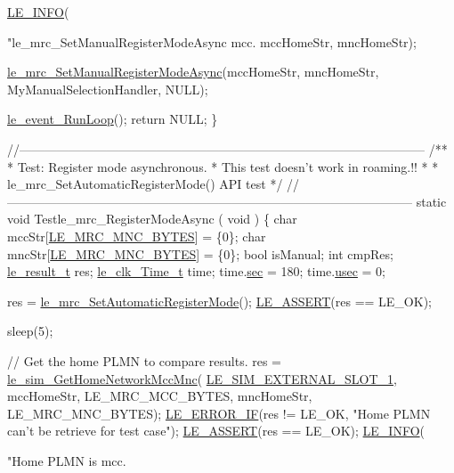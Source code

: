 \begin{DoxyCodeInclude}
{{{{{{    \hyperlink{le__log_8h_a23e6d206faa64f612045d688cdde5808}{LE\_INFO}(\textcolor{stringliteral}{"le\_mrc\_SetManualRegisterModeAsync mcc.%
        mccHomeStr, mncHomeStr);

    \hyperlink{le__mrc__interface_8h_a5b40356a56f524f5f5c9e5744687919d}{le\_mrc\_SetManualRegisterModeAsync}(mccHomeStr, mncHomeStr, 
      MyManualSelectionHandler, NULL);

    \hyperlink{le__event_loop_8h_ae313b457994371c658be9fe0494a01ff}{le\_event\_RunLoop}();
    \textcolor{keywordflow}{return} NULL;
\}


\textcolor{comment}{//--------------------------------------------------------------------------------------------------}\textcolor{comment}{}
\textcolor{comment}{/**}
\textcolor{comment}{ * Test: Register mode asynchronous.}
\textcolor{comment}{ * This test doesn't work in roaming.!!}
\textcolor{comment}{ *}
\textcolor{comment}{ * le\_mrc\_SetAutomaticRegisterMode() API test}
\textcolor{comment}{ */}
\textcolor{comment}{//--------------------------------------------------------------------------------------------------}
\textcolor{keyword}{static} \textcolor{keywordtype}{void} Testle\_mrc\_RegisterModeAsync
(
    \textcolor{keywordtype}{void}
)
\{
    \textcolor{keywordtype}{char} mccStr[\hyperlink{le__mrc__interface_8h_aeae0e240c77730be724ad7ac42596469}{LE\_MRC\_MNC\_BYTES}] = \{0\};
    \textcolor{keywordtype}{char} mncStr[\hyperlink{le__mrc__interface_8h_aeae0e240c77730be724ad7ac42596469}{LE\_MRC\_MNC\_BYTES}] = \{0\};
    \textcolor{keywordtype}{bool} isManual;
    \textcolor{keywordtype}{int} cmpRes;
    \hyperlink{le__basics_8h_a1cca095ed6ebab24b57a636382a6c86c}{le\_result\_t} res;
    \hyperlink{structle__clk___time__t}{le\_clk\_Time\_t} time;
    time.\hyperlink{structle__clk___time__t_ae28e527dbd551b3537edc1737611782f}{sec} = 180;
    time.\hyperlink{structle__clk___time__t_a8324bdde9199a09a47489a3f246f184c}{usec} = 0;

    res = \hyperlink{le__mrc__interface_8h_acb434a9f91afb5b6639baf3678ee9388}{le\_mrc\_SetAutomaticRegisterMode}();
    \hyperlink{le__log_8h_ac0dbbef91dc0fed449d0092ff0557b39}{LE\_ASSERT}(res == LE\_OK);

    sleep(5);

    \textcolor{comment}{// Get the home PLMN to compare results.}
    res = \hyperlink{le__sim__interface_8h_a6bab381ed34046b553145bfbe53dfa3c}{le\_sim\_GetHomeNetworkMccMnc}(
      \hyperlink{le__sim__interface_8h_aace49df88426119626fb1ef4e544ccdda4270fb44e8fa7876f337864675b42f2d}{LE\_SIM\_EXTERNAL\_SLOT\_1}, mccHomeStr, LE\_MRC\_MCC\_BYTES,
        mncHomeStr, LE\_MRC\_MNC\_BYTES);
    \hyperlink{le__log_8h_aceaf11a11691d6c676e36dd317b38dbd}{LE\_ERROR\_IF}(res != LE\_OK, \textcolor{stringliteral}{"Home PLMN can't be retrieve for test case"});
    \hyperlink{le__log_8h_ac0dbbef91dc0fed449d0092ff0557b39}{LE\_ASSERT}(res == LE\_OK);
    \hyperlink{le__log_8h_a23e6d206faa64f612045d688cdde5808}{LE\_INFO}(\textcolor{stringliteral}{"Home PLMN is mcc.%

}}}}}}}}
\end{DoxyCodeInclude}

